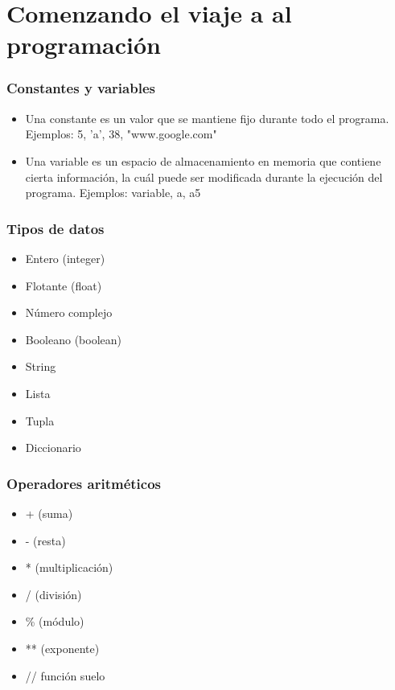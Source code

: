\documentclass[hyperref={pdfpagelabels=false},xcolor=pst,pdf,fragile]{beamer}
\author{
  Luis, FirstName1
  \texttt{luis.last1@gmail.com}
  \and
  \\Carlos Rodríguez
  \texttt{carlosrdz.isd@gmail.com}
}
\title{\Title}
\date{\today}
\begin{document}
\maketitle



\section{Comenzando el viaje a al programación}
\begin{frame}
    \frametitle{Constantes y variables}
    \pause
    \begin{itemize}
    \item Una constante es un valor que se mantiene fijo durante todo el programa. 
    Ejemplos: 5, 'a', 38, "www.google.com"
    \item Una variable es un espacio de almacenamiento en memoria que contiene cierta información, la cuál puede ser modificada durante la ejecución del programa.
    Ejemplos: variable, a, a5
    \end{itemize}
\end{frame}

\begin{frame}
    \frametitle{Tipos de datos}
    \pause
    \begin{itemize}
    \item Entero (integer)
    \item Flotante (float)
    \item Número complejo
    \item Booleano (boolean)
    \item String
    \item Lista
    \item Tupla
    \item Diccionario
    \end{itemize}
\end{frame}

\begin{frame}
    \frametitle{Operadores aritméticos}
    \pause
    \begin{itemize}
    \item + (suma)
    \item - (resta)
    \item * (multiplicación)
    \item / (división)
    \item \% (módulo)
    \item ** (exponente)
    \item // función suelo
    \end{itemize}
\end{frame}
\end{document}
